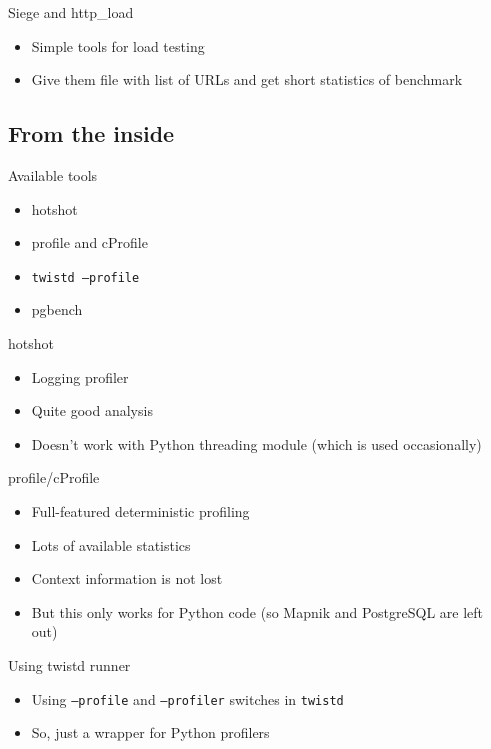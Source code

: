 \documentclass[16pt]{beamer}
\begin{document}
\begin{frame}{Siege and http\_load}
  \begin{itemize}
  \item Simple tools for load testing
  \item Give them file with list of URLs and get short statistics of benchmark
  \end{itemize}
\end{frame}

\subsection{From the inside}

\begin{frame}{Available tools}
  \begin{itemize}
  \item hotshot
  \item profile and cProfile
  \item \texttt{twistd --profile}
  \item pgbench
  \end{itemize}
\end{frame}

\begin{frame}{hotshot}
  \begin{itemize}
  \item Logging profiler
  \item Quite good analysis
  \item Doesn't work with Python threading module (which is used occasionally)
  \end{itemize}
\end{frame}

\begin{frame}{profile/cProfile}
  \begin{itemize}
  \item Full-featured deterministic profiling
  \item Lots of available statistics
  \item Context information is not lost
  \item But this only works for Python code (so Mapnik and PostgreSQL are left out)
  \end{itemize}
\end{frame}

\begin{frame}{Using twistd runner}
  \begin{itemize}
  \item Using \texttt{--profile} and \texttt{--profiler}
    switches in \texttt{twistd}
  \item So, just a wrapper for Python profilers
  \end{itemize}
\end{frame}
\end{document}
